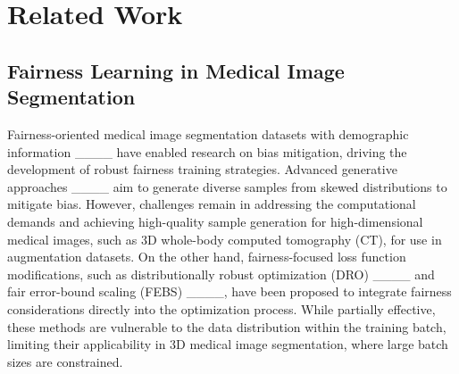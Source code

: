 \section{Related Work}
\subsection{Fairness Learning in Medical Image Segmentation}
Fairness-oriented medical image segmentation datasets with demographic information ____ have enabled research on bias mitigation, driving the development of robust fairness training strategies. Advanced generative approaches ____ aim to generate diverse samples from skewed distributions to mitigate bias. However, challenges remain in addressing the computational demands and achieving high-quality sample generation for high-dimensional medical images, such as 3D whole-body computed tomography (CT), for use in augmentation datasets. On the other hand, fairness-focused loss function modifications, such as distributionally robust optimization (DRO) ____ and fair error-bound scaling (FEBS) ____, have been proposed to integrate fairness considerations directly into the optimization process. While partially effective, these methods are vulnerable to the data distribution within the training batch, limiting their applicability in 3D medical image segmentation, where large batch sizes are constrained. 
 
